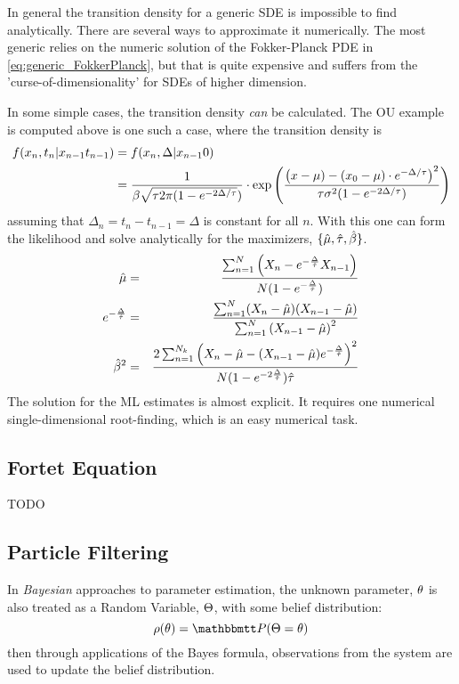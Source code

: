 In general the transition density for a generic SDE is impossible to find
analytically. There are several ways to approximate it numerically. The most
generic relies on the numeric solution of the Fokker-Planck PDE in
\cref{eq:generic_FokkerPlanck}, but that is quite expensive and suffers from the
'curse-of-dimensionality' for SDEs of higher dimension. 

In some simple cases, the transition density {\sl can} be calculated. The OU
example is computed above is one such a case, where the transition density is
\begin{align*}
f(x_n, t_n| x_{n-1} t_{n-1}) &=
 f(x_n, \Delta| x_{n-1} 0)\\& =
 \frac{1}{ \beta \sqrt{{ \tau } 2\pi(1 -  e^{-2 \Delta/{ \tau }}})}
 	\cdot \exp\left(\frac{\left( x - \mu)  - (x_{0} - \mu) \cdot
 	 e^{-\Delta/{ \tau }} \right)^2  } {{\tau} \sigma^2  (1-e^{-2 \Delta/{ \tau }})}
 	\right) 
\end{align*}
assuming that $\Delta_n = t_n-t_{n-1} = \Delta$ is constant for all $n$.
With this one can form the likelihood and solve analytically for the
maximizers, $\{\hat{{\mu }} , \hat{{ \tau }}, \hat{\beta} \}$.
\begin{eqnarray} 
\hat{ \mu} &=& 
\frac{  \sum_{n=1}^{N } 
     \left( X_n - e^{-\frac{\Delta} {\hat {{ \tau }}}} X_{n-1} \right)} 
	 { N( 1-e^{-\frac {\Delta} {\hat {{ \tau }}}}) }
\\
e^{-\frac {\Delta}{\hat{{ \tau }}} } &=& 
\frac { \sum_{n=1}^{N} 
			( X_n -  \hat \mu)(X_{n-1} -  \hat \mu) }
    {   \sum_{n=1}^{N } \left( X_{n-1} - \hat \mu
    \right)^2 }
\\
\hat\beta^2 &=&  
\frac{ 2  \sum_{n=1}^{N_k}  \left( X_n - \hat \mu - (X_{n-1} -
\hat \mu) e^{-\frac {\Delta} {\hat {{ \tau }}}} \right)^2 } 
	  { N (1-e^{-2\frac {\Delta} {\hat {{ \tau }}}}) \hat {{ \tau }}}
\end{eqnarray}
The solution for the ML estimates is almost explicit. It requires one numerical
single-dimensional root-finding, which is an easy numerical task.

\subsection{Fortet Equation}
TODO

\subsection{Particle Filtering}
In {\sl Bayesian} approaches to parameter estimation, the unknown parameter,
${ \theta}$ is also treated as a Random Variable, ${\Theta}$, with some belief
distribution: $$
\rho(\th) = \Prob(\Theta = \th)
$$
then through applications of the Bayes formula, observations from the system are
used to update the belief distribution.


